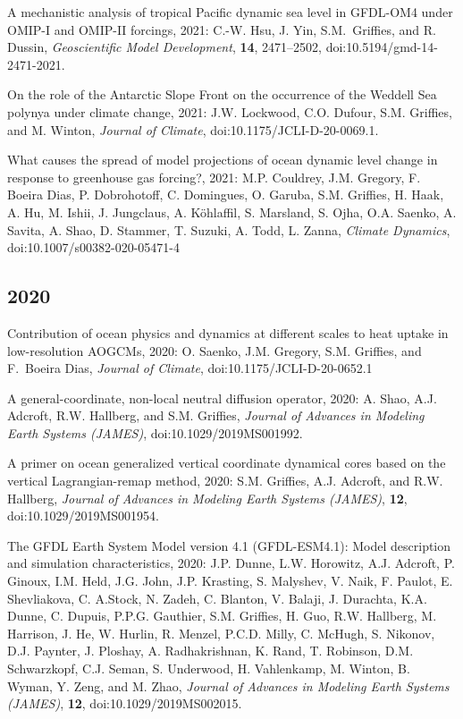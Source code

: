 \begin{etaremune}
\item A mechanistic analysis of tropical Pacific dynamic sea level in GFDL-OM4 under OMIP-I and OMIP-II forcings, 2021: C.-W. Hsu, J. Yin, S.M.\ Grif\/f\/ies, and R. Dussin, {\it Geoscientific Model Development}, {\bf 14}, 2471--2502, doi:10.5194/gmd-14-2471-2021.

\item On the role of the Antarctic Slope Front on the occurrence of the Weddell Sea polynya under climate change, 2021: J.W. Lockwood, C.O. Dufour, S.M. Grif\/f\/ies, and M. Winton, {\it Journal of Climate}, doi:10.1175/JCLI-D-20-0069.1.

\item What causes the spread of model projections of ocean dynamic level change in response to greenhouse gas forcing?, 2021:  M.P. Couldrey, J.M. Gregory,  F. Boeira Dias, P. Dobrohotoff, C. Domingues, O. Garuba, S.M. Griffies, H. Haak, A. Hu, M. Ishii, J. Jungclaus, A. {K\"{o}hlaffil}, S. Marsland, S. Ojha, O.A. Saenko, A. Savita, A. Shao, D. Stammer, T. Suzuki, A. Todd, L. Zanna, {\it Climate Dynamics}, doi:10.1007/s00382-020-05471-4


\subsection*{\sc \color{Maroon} 2020}

\item Contribution of ocean physics and dynamics at different scales to heat uptake in low-resolution AOGCMs, 2020: O. Saenko, J.M. Gregory, S.M. Grif\/f\/ies, and F.\ Boeira Dias, {\it Journal of Climate}, doi:10.1175/JCLI-D-20-0652.1

\item A general-coordinate, non-local neutral diffusion operator, 2020: A. Shao, A.J. Adcroft, R.W. Hallberg, and S.M. Grif\/f\/ies, {\it Journal of Advances in Modeling Earth Systems (JAMES)}, doi:10.1029/2019MS001992.



\item A primer on ocean generalized vertical coordinate dynamical cores based on the vertical Lagrangian-remap method, 2020: S.M. Grif\/f\/ies, A.J. Adcroft, and R.W. Hallberg, {\it Journal of Advances in Modeling Earth Systems (JAMES)}, {\bf 12}, \\ doi:10.1029/2019MS001954.

\item The GFDL Earth System Model version 4.1 (GFDL-ESM4.1): Model description and simulation characteristics, 2020: J.P. Dunne, L.W. Horowitz, A.J. Adcroft, P. Ginoux, I.M. Held, J.G. John, J.P. Krasting, S. Malyshev, V. Naik, F. Paulot, E. Shevliakova, C. A.Stock, N. Zadeh, C. Blanton, V. Balaji, J. Durachta, K.A. Dunne, C. Dupuis, P.P.G. Gauthier, S.M. Griffies, H. Guo, R.W. Hallberg, M. Harrison, J. He, W. Hurlin, R. Menzel, P.C.D. Milly, C. McHugh, S. Nikonov, D.J. Paynter, J. Ploshay, A. Radhakrishnan, K. Rand, T. Robinson, D.M. Schwarzkopf, C.J. Seman, S. Underwood, H. Vahlenkamp, M. Winton, B. Wyman, Y. Zeng, and M. Zhao, {\it Journal of Advances in Modeling Earth Systems (JAMES)}, {\bf 12}, doi:10.1029/2019MS002015.


\end{etaremune}

